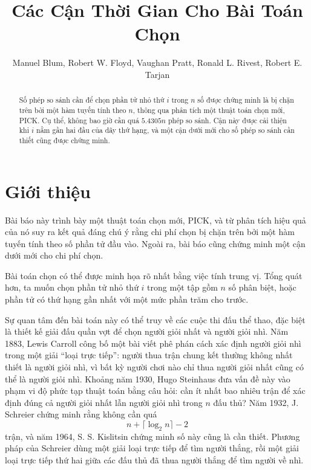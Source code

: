 \documentclass[11pt]{article}
\title{Các Cận Thời Gian Cho Bài Toán Chọn}
\author{Manuel Blum, Robert W. Floyd, Vaughan Pratt, Ronald L. Rivest, Robert E. Tarjan}
\date{}
\newcommand{\PICK}{\textsc{PICK}}
\begin{document}
\maketitle


\begin{abstract}
Số phép so sánh cần để chọn phần tử nhỏ thứ \(i\) trong \(n\) số được chứng
minh là bị chặn trên bởi một hàm tuyến tính theo \(n\), thông qua phân tích
một thuật toán chọn mới, \PICK. Cụ thể, không bao giờ cần quá \(5.4305n\) phép
so sánh. Cận này được cải thiện khi \(i\) nằm gần hai đầu của dãy thứ hạng, và
một cận dưới mới cho số phép so sánh cần thiết cũng được chứng minh.
\end{abstract}

\section{Giới thiệu}

Bài báo này trình bày một thuật toán chọn mới, \PICK, và từ phân tích hiệu
quả của nó suy ra kết quả đáng chú ý rằng chi phí chọn bị chặn trên bởi một
hàm tuyến tính theo số phần tử đầu vào. Ngoài ra, bài báo cũng chứng minh một
cận dưới mới cho chi phí chọn.

Bài toán chọn có thể được minh họa rõ nhất bằng việc tính trung vị. Tổng quát
hơn, ta muốn chọn phần tử nhỏ thứ \(i\) trong một tập gồm \(n\) số phân biệt,
hoặc phần tử có thứ hạng gần nhất với một mức phần trăm cho trước.

Sự quan tâm đến bài toán này có thể truy về các cuộc thi đấu thể thao, đặc
biệt là thiết kế giải đấu quần vợt để chọn người giỏi nhất và người giỏi nhì.
Năm 1883, Lewis Carroll công bố một bài viết phê phán cách xác định người
giỏi nhì trong một giải ``loại trực tiếp'': người thua trận chung kết thường
không nhất thiết là người giỏi nhì, vì bất kỳ người chơi nào chỉ thua người
giỏi nhất cũng có thể là người giỏi nhì. Khoảng năm 1930, Hugo Steinhaus đưa
vấn đề này vào phạm vi độ phức tạp thuật toán bằng câu hỏi: cần ít nhất bao
nhiêu trận để xác định đúng cả người giỏi nhất lẫn người giỏi nhì trong \(n\)
đấu thủ? Năm 1932, J. Schreier chứng minh rằng không cần quá
\[
  n+\lceil\log_2 n\rceil-2
\]
trận, và năm 1964, S. S. Kislitsin chứng minh số này cũng là cần thiết.
Phương pháp của Schreier dùng một giải loại trực tiếp để tìm người thắng, rồi
một giải loại trực tiếp thứ hai giữa các đấu thủ đã thua người thắng để tìm
người về nhì.
\end{document}
